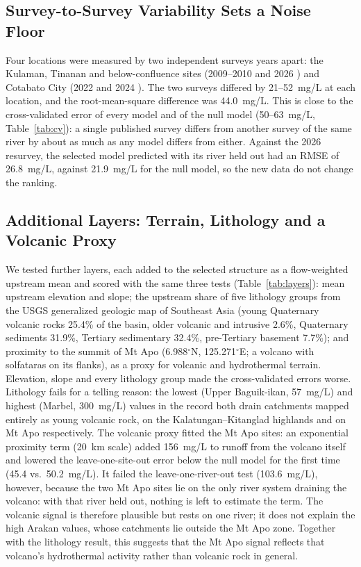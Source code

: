\documentclass[10pt,twocolumn,letterpaper]{article}
\begin{document}
\subsection{Survey-to-Survey Variability Sets a Noise Floor}
Four locations were measured by two independent surveys years apart: the Kulaman, Tinanan and below-confluence sites (2009--2010 \cite{villabeto} and 2026 \cite{wong}) and Cotabato City (2022 \cite{alombro} and 2024 \cite{dimalen}). The two surveys differed by 21--52~mg/L at each location, and the root-mean-square difference was 44.0~mg/L. This is close to the cross-validated error of every model and of the null model (50--63~mg/L, Table~\ref{tab:cv}): a single published survey differs from another survey of the same river by about as much as any model differs from either. Against the 2026 resurvey, the selected model predicted with its river held out had an RMSE of 26.8~mg/L, against 21.9~mg/L for the null model, so the new data do not change the ranking.

\subsection{Additional Layers: Terrain, Lithology and a Volcanic Proxy}
We tested further layers, each added to the selected structure as a flow-weighted upstream mean and scored with the same three tests (Table~\ref{tab:layers}): mean upstream elevation and slope; the upstream share of five lithology groups from the USGS generalized geologic map of Southeast Asia \cite{usgsgeo} (young Quaternary volcanic rocks 25.4\% of the basin, older volcanic and intrusive 2.6\%, Quaternary sediments 31.9\%, Tertiary sedimentary 32.4\%, pre-Tertiary basement 7.7\%); and proximity to the summit of Mt Apo (6.988$^\circ$N, 125.271$^\circ$E; a volcano with solfataras on its flanks), as a proxy for volcanic and hydrothermal terrain. Elevation, slope and every lithology group made the cross-validated errors worse. Lithology fails for a telling reason: the lowest (Upper Baguik-ikan, 57~mg/L) and highest (Marbel, 300~mg/L) values in the record both drain catchments mapped entirely as young volcanic rock, on the Kalatungan--Kitanglad highlands and on Mt Apo respectively. The volcanic proxy fitted the Mt Apo sites: an exponential proximity term (20~km scale) added 156~mg/L to runoff from the volcano itself and lowered the leave-one-site-out error below the null model for the first time (45.4 vs.\ 50.2~mg/L). It failed the leave-one-river-out test (103.6~mg/L), however, because the two Mt Apo sites lie on the only river system draining the volcano: with that river held out, nothing is left to estimate the term. The volcanic signal is therefore plausible but rests on one river; it does not explain the high Arakan values, whose catchments lie outside the Mt Apo zone. Together with the lithology result, this suggests that the Mt Apo signal reflects that volcano's hydrothermal activity rather than volcanic rock in general.
\end{document}
